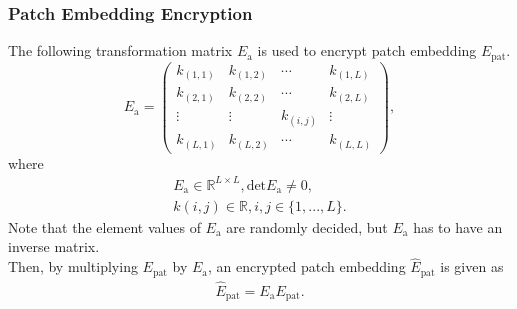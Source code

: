 \documentclass[conference, a4paper]{IEEEtran}
\begin{document}
\subsubsection{Patch Embedding Encryption}
The following transformation matrix $E_{\text{a}}$ is used to encrypt patch embedding $E_{\text{pat}}$.
\begin{equation}
    E_\text{a} = 
    \begin{pmatrix}
        k_{(1,1)} & k_{(1,2)} & \cdots & k_{(1,L)} \\
        k_{(2,1)} & k_{(2,2)} & \cdots & k_{(2,L)} \\
        \vdots & \vdots & k_{(i,j)} & \vdots \\
        k_{(L,1)} & k_{(L,2)} & \cdots & k_{(L,L)}
    \end{pmatrix},
\end{equation}
where
\begin{align}
    E_\text{a} \in{\mathbb{R}^{L \times L}}, \text{det}E_\text{a} \neq 0, \nonumber \\
    k(i,j) \in{\mathbb{R}}, i,j \in \{1, ..., L\} \nonumber.
\end{align}
Note that the element values of $E_{\text{a}}$ are randomly decided, but $E_{\text{a}}$ has to have an inverse matrix.\\
Then, by multiplying $E_{\text{pat}}$ by $E_{\text{a}}$, an encrypted patch embedding $\widehat{E}_{\text{pat}}$ is given as
\begin{align}
    \widehat{E}_{\text{pat}} = E_{\text{a}} E_{\text{pat}}.
\end{align}
\end{document}
